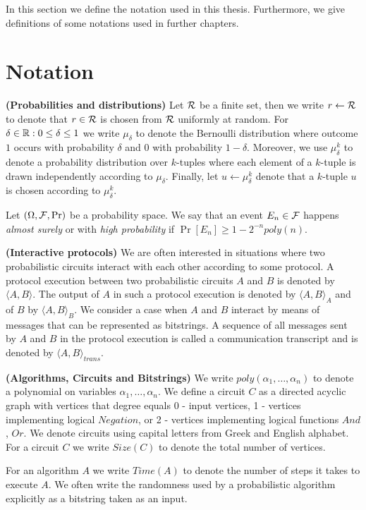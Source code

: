 In this section we define the notation used in this thesis. Furthermore, we give definitions of some notations
used in further chapters.
\section{Notation}
\textbf{(Probabilities and distributions)}
Let $\mathcal{R}$ be a finite set, then we write $r \leftarrow \mathcal{R}$ to denote that $r \in \mathcal{R}$ is chosen from $\mathcal{R}$ uniformly at random.
For $\delta \in \mathbb{R} : 0 \leq \delta \leq 1$ we write $\mu_{\delta}$ to denote the Bernoulli distribution where outcome $1$ occurs with
probability $\delta$ and $0$ with probability $1-\delta$.
Moreover, we use $\mu_{\delta}^k$ to denote a probability distribution over $k$-tuples
where each element of a $k$-tuple is drawn independently according to $\mu_{\delta}$.
Finally, let $u \leftarrow \mu_{\delta}^k$ denote that a $k$-tuple $u$ is chosen according to $\mu_{\delta}^k$.

Let $(\Omega, \mathcal{F}, \Pr)$ be a probability space. We say that an event $E_n \in \mathcal{F}$
happens \textit{almost surely} or with \textit{high probability} if $\Pr[E_n] \geq 1 - 2^{-n} \mathit{poly}(n)$.

\textbf{(Interactive protocols)} We are often interested in situations where two probabilistic circuits interact with each other according to some protocol.
A protocol execution between two probabilistic circuits $A$ and $B$ is denoted by $\langle A, B \rangle$.
The output of $A$ in such a protocol execution is denoted by $\langle A, B \rangle_A$ and of $B$ by $\langle A, B \rangle_B$.
We consider a case when $A$ and $B$ interact by means of messages that can be represented as bitstrings.
A sequence of all messages sent by $A$ and $B$ in the protocol execution is called a communication transcript and
is denoted by $\langle A, B \rangle_{\mathit{trans}}$.

\textbf{(Algorithms, Circuits and Bitstrings)}
We write $\mathit{poly}(\alpha_1, \dots, \alpha_n)$ to denote a polynomial on variables $\alpha_1, \dots, \alpha_n$.
We define a circuit $C$ as a directed acyclic graph with vertices that degree equals 0 - input vertices,
1 - vertices implementing logical $\mathit{Negation}$, or 2 - vertices implementing logical functions $\mathit{And}$, $\mathit{Or}$.
We denote circuits using capital letters from Greek and English alphabet.
For a circuit $C$ we write $\mathit{Size}(C)$ to denote the total number of vertices.

For an algorithm $A$ we write $\mathit{Time}(A)$ to denote the number of steps it takes to execute $A$.
We often write the randomness used by a probabilistic algorithm explicitly as a bitstring taken as an input.

